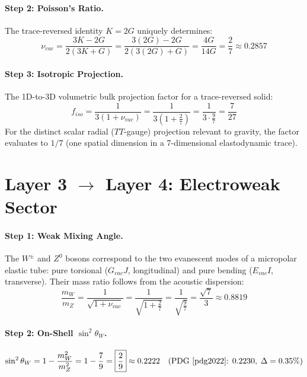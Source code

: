 \paragraph{Step 2: Poisson's Ratio.}
The trace-reversed identity $K = 2G$ uniquely determines:
\begin{equation}
    \nu_{vac}
    = \frac{3K - 2G}{2(3K + G)}
    = \frac{3(2G) - 2G}{2(3(2G) + G)}
    = \frac{4G}{14G}
    = \boxed{\frac{2}{7}}
    \approx 0.2857
    \label{eq:nu_vac}
\end{equation}

\paragraph{Step 3: Isotropic Projection.}
The 1D-to-3D volumetric bulk projection factor for a trace-reversed solid:
\begin{equation}
    f_{iso} = \frac{1}{3(1 + \nu_{vac})}
    = \frac{1}{3\!\left(1 + \frac{2}{7}\right)}
    = \frac{1}{3 \cdot \frac{9}{7}}
    = \frac{7}{27}
\end{equation}
For the distinct scalar radial ($TT$-gauge) projection relevant to gravity,
the factor evaluates to $1/7$ (one spatial dimension in a 7-dimensional
elastodynamic trace).

\section{Layer 3 $\to$ Layer 4: Electroweak Sector}
\label{sec:layer34}

\paragraph{Step 1: Weak Mixing Angle.}
The $W^{\pm}$ and $Z^0$ bosons correspond to the two evanescent modes of a
micropolar elastic tube: pure torsional ($G_{vac}J$, longitudinal) and
pure bending ($E_{vac}I$, transverse). Their mass ratio follows from the
acoustic dispersion:
\begin{equation}
    \frac{m_W}{m_Z}
    = \frac{1}{\sqrt{1 + \nu_{vac}}}
    = \frac{1}{\sqrt{1 + \frac{2}{7}}}
    = \frac{1}{\sqrt{\frac{9}{7}}}
    = \boxed{\frac{\sqrt{7}}{3}}
    \approx 0.8819
    \label{eq:weak_mixing}
\end{equation}

\paragraph{Step 2: On-Shell $\sin^{2}\theta_{W}$.}
\begin{equation}
    \sin^2\theta_W
    = 1 - \frac{m_W^2}{m_Z^2}
    = 1 - \frac{7}{9}
    = \boxed{\frac{2}{9}}
    \approx 0.2222
    \quad\text{(PDG~\cite{pdg2022}: } 0.2230,\; \Delta = 0.35\%\text{)}
    \label{eq:sin2tw}
\end{equation}

